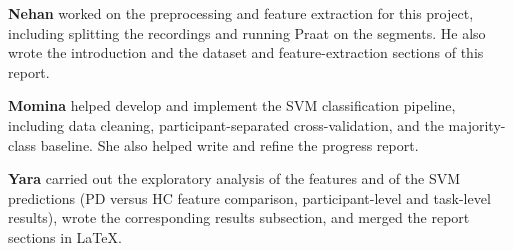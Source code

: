 \documentclass[11pt]{article}
\begin{document}
\textbf{Nehan} worked on the preprocessing and feature extraction for this project,
including splitting the recordings and running Praat on the segments. He also wrote the
introduction and the dataset and feature-extraction sections of this report.

\textbf{Momina} helped develop and implement the SVM classification pipeline, including
data cleaning, participant-separated cross-validation, and the majority-class baseline. She
also helped write and refine the progress report.

\textbf{Yara} carried out the exploratory analysis of the features and of the SVM
predictions (PD versus HC feature comparison, participant-level and task-level results),
wrote the corresponding results subsection, and merged the report sections in \LaTeX.


\end{document}
